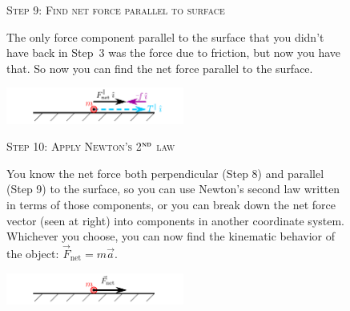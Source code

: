 \documentclass[10pt,letterpaper,twoside]{article}
\begin{document}
\FloatBarrier
\begin{figure}[h!]
  \begin{minipage}[l]{0.70\textwidth}
	{\Large\textsc{Step 9}:} {\large\textsc{Find net force parallel to surface}}{\quad}

	The only force component parallel to the surface that you didn't have back in Step~3 was the force due to friction, but now you have that.
	So now you can find the net force parallel to the surface.
  \end{minipage}
  \begin{minipage}[c]{0.25\textwidth}
	\includegraphics[keepaspectratio=true,width=2.30in]{./how_to_normal_force_and_friction_f09.pdf}
    \label{fig:09}
  \end{minipage}
\end{figure}
\FloatBarrier
\begin{figure}[h!]
  \begin{minipage}[l]{0.70\textwidth}
	{\Large\textsc{Step 10}:} {\large\textsc{Apply Newton's 2$^\textsc{nd}$ law}}{\quad}

	You know the net force both perpendicular (Step 8) and parallel (Step 9) to the surface, so you can use Newton's second law written in terms of those components, or you can break down the net force vector (seen at right) into components in another coordinate system.
	Whichever you choose, you can now find the kinematic behavior of the object: $\vec F_{\text{net}}=m\vec a$.
  \end{minipage}
  \begin{minipage}[c]{0.25\textwidth}
	\includegraphics[keepaspectratio=true,width=2.30in]{./how_to_normal_force_and_friction_f10.pdf}
    \label{fig:10}
  \end{minipage}
\end{figure}
\end{document}
